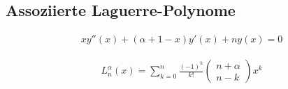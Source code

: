 \subsection{Assoziierte Laguerre-Polynome
\label{laguerre:subsection:assoz_laguerre}
}
\begin{align}
x y''(x) + (\alpha + 1 - x) y'(x) + n y(x)
=
0 
\label{laguerre:generell_dgl}
\end{align}

\begin{align}
L_n^\alpha (x)
=
\sum_{k=0}^{n} 
\frac{(-1)^k}{k!}
\begin{pmatrix}
n + \alpha \\
n - k
\end{pmatrix}
x^k
\label{laguerre:polynom}
\end{align}

